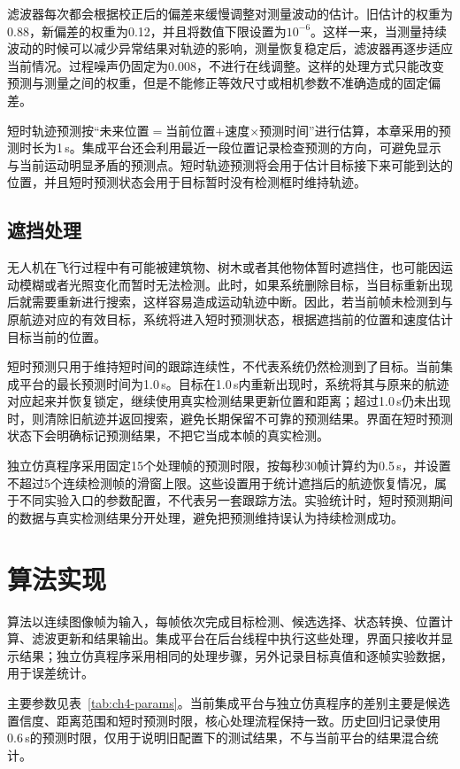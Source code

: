 滤波器每次都会根据校正后的偏差来缓慢调整对测量波动的估计。旧估计的权重为0.88，新偏差的权重为0.12，并且将数值下限设置为$10^{-6}$。这样一来，当测量持续波动的时候可以减少异常结果对轨迹的影响，测量恢复稳定后，滤波器再逐步适应当前情况。过程噪声仍固定为0.008，不进行在线调整。这样的处理方式只能改变预测与测量之间的权重，但是不能修正等效尺寸或相机参数不准确造成的固定偏差。

短时轨迹预测按“未来位置$=$当前位置$+$速度$\times$预测时间”进行估算，本章采用的预测时长为1\,s。集成平台还会利用最近一段位置记录检查预测的方向，可避免显示与当前运动明显矛盾的预测点。短时轨迹预测将会用于估计目标接下来可能到达的位置，并且短时预测状态会用于目标暂时没有检测框时维持轨迹。

\subsection{遮挡处理}

无人机在飞行过程中有可能被建筑物、树木或者其他物体暂时遮挡住，也可能因运动模糊或者光照变化而暂时无法检测。此时，如果系统删除目标，当目标重新出现后就需要重新进行搜索，这样容易造成运动轨迹中断。因此，若当前帧未检测到与原航迹对应的有效目标，系统将进入短时预测状态，根据遮挡前的位置和速度估计目标当前的位置。

短时预测只用于维持短时间的跟踪连续性，不代表系统仍然检测到了目标。当前集成平台的最长预测时间为1.0\,s。目标在1.0\,s内重新出现时，系统将其与原来的航迹对应起来并恢复锁定，继续使用真实检测结果更新位置和距离；超过1.0\,s仍未出现时，则清除旧航迹并返回搜索，避免长期保留不可靠的预测结果。界面在短时预测状态下会明确标记预测结果，不把它当成本帧的真实检测。

独立仿真程序采用固定15个处理帧的预测时限，按每秒30帧计算约为0.5\,s，并设置不超过5个连续检测帧的滑窗上限。这些设置用于统计遮挡后的航迹恢复情况，属于不同实验入口的参数配置，不代表另一套跟踪方法。实验统计时，短时预测期间的数据与真实检测结果分开处理，避免把预测维持误认为持续检测成功。

\section{算法实现}

算法以连续图像帧为输入，每帧依次完成目标检测、候选选择、状态转换、位置计算、滤波更新和结果输出。集成平台在后台线程中执行这些处理，界面只接收并显示结果；独立仿真程序采用相同的处理步骤，另外记录目标真值和逐帧实验数据，用于误差统计。

主要参数见表~\ref{tab:ch4-params}。当前集成平台与独立仿真程序的差别主要是候选置信度、距离范围和短时预测时限，核心处理流程保持一致。历史回归记录使用0.6\,s的预测时限，仅用于说明旧配置下的测试结果，不与当前平台的结果混合统计。


